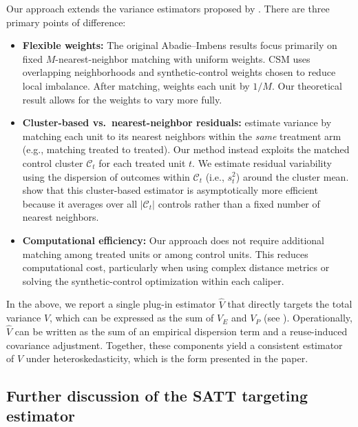 \documentclass[11pt]{article}
\begin{document}
Our approach extends the variance estimators proposed by \citet{abadie2006large, abadie2011bias, abadie2012martingale}.
There are three primary points of difference:

\begin{itemize}
    \item \textbf{Flexible weights:} The original Abadie--Imbens results focus primarily on fixed $M$-nearest-neighbor matching with uniform weights. CSM uses overlapping neighborhoods and synthetic-control weights chosen to reduce local imbalance. After matching, \citet{abadie2006large} weights each unit by $1/M$. Our theoretical result allows for the weights to vary more fully.

    \item \textbf{Cluster-based vs.\ nearest-neighbor residuals:} \citet{abadie2006large} estimate variance by matching each unit to its nearest neighbors within the \emph{same} treatment arm (e.g., matching treated to treated). Our method instead exploits the matched control cluster $\mathcal{C}_t$ for each treated unit $t$. We estimate residual variability using the dispersion of outcomes within $\mathcal{C}_t$ (i.e., $s_t^2$) around the cluster mean. \citet{meng2025varianceestimationmatchingreweighting} show that this cluster-based estimator is asymptotically more efficient because it averages over all $|\mathcal{C}_t|$ controls rather than a fixed number of nearest neighbors.
    
    \item \textbf{Computational efficiency:} Our approach does not require additional matching among treated units or among control units. This reduces computational cost, particularly when using complex distance metrics or solving the synthetic-control optimization within each caliper.

\end{itemize}

In the above, we report a single plug-in estimator $\hat V$ that directly targets the total variance $V$, which can be expressed as the sum of $V_E$ and $V_P$ (see \citet{meng2025varianceestimationmatchingreweighting}).
Operationally, $\hat V$ can be written as the sum of an empirical dispersion term and a reuse-induced covariance adjustment.
Together, these components yield a consistent estimator of $V$ under heteroskedasticity, which is the form presented in the paper.



\subsection{Further discussion of the SATT targeting estimator}
\end{document}
